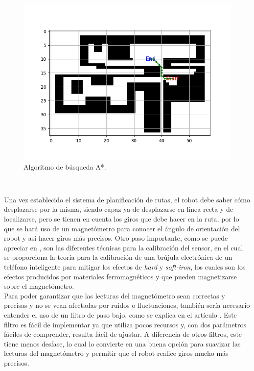 \begin{figure} [H]
  \begin{center}
    \includegraphics[scale=0.4]{figs/astar}
  \end{center}
  \caption{Algoritmo de búsqueda A*.}
  \label{fig:astar}
\end{figure}\

Una vez establecido el sistema de planificación de rutas, el robot debe saber cómo desplazarse por la misma, siendo capaz ya de desplazarse en línea recta y de localizarse, pero se tienen en cuenta los giros que debe hacer en la ruta, por lo que se hará uso de un magnetómetro para conocer el ángulo de orientación del robot y así hacer giros más precisos. Otro paso importante, como se puede apreciar en \cite{Ozyagcilar2015}, son las diferentes técnicas para la calibración del sensor, en el cual se proporciona la teoría para la calibración de una brújula electrónica de un teléfono inteligente para mitigar los efectos de \textit{hard} y \textit{soft-iron}, los cuales son los efectos producidos por materiales ferromagnéticos y que pueden magnetizarse sobre el magnetómetro.\\

Para poder garantizar que las lecturas del magnetómetro sean correctas y precisas y no se vean afectadas por ruidos o fluctuaciones, también sería necesario entender el uso de un filtro de paso bajo, como se explica en el artículo \cite{low_pass_filter}. Este filtro es fácil de implementar ya que utiliza pocos recursos y, con dos parámetros fáciles de comprender, resulta fácil de ajustar. A diferencia de otros filtros, este tiene menos desfase, lo cual lo convierte en una buena opción para suavizar las lecturas del magnetómetro y permitir que el robot realice giros mucho más precisos.



\vspace{15cm} %







